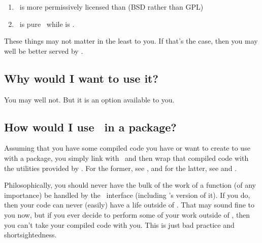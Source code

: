 \begin{enumerate}
  \item \thispackage\ is more permissively licensed than  (BSD rather than GPL)
  \item \thispackage\ is pure \C\, while  is \Cpp.
\end{enumerate}

These things may not matter in the least to you.  If that's the case, then you
may well be better served by .


\subsection{Why would I want to use it?}

You may well not.  But it is an option available to you.


\subsection{How would I use \thispackage\ in a package?}

Assuming that you have some compiled code you have or want to create to use with a 
package, you simply link with \thispackage\ and then wrap that compiled code with 
the utilities provided by \thispackage.  For the former, see , 
and for the latter, see  and .

Philosophically, you should never have the bulk of the work of a function (of any
importance) be handled by the \R\ interface (including \thispackage's version of it).
If you do, then your code can never (easily) have a life outside of \R.  That may sound fine to you
now, but if you ever decide to perform some of your work outside of \R, then you can't take
your compiled code with you.  This is just bad practice and shortsightedness.  



